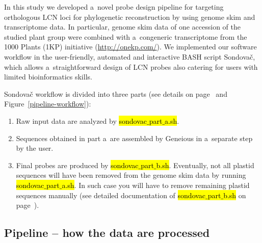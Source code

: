\documentclass[a4paper, 11pt, twoside]{article}
\renewcommand{\texttt}[1]{\hl{\ttfamily #1}}
\begin{document}
In this study \citep{Schmickl2016} we developed a~novel probe design pipeline for targeting orthologous LCN loci for phylogenetic reconstruction by using genome skim and transcriptome data. In particular, genome skim data of one accession of the studied plant group were combined with a~congeneric transcriptome from the 1000 Plants (1KP) initiative (\url{http://onekp.com/}). We implemented our software workflow in the user-friendly, automated and interactive BASH script Sondovač, which allows a~straightforward design of LCN probes also catering for users with limited bioinformatics skills.

Sondovač workflow is divided into three parts (see details on page~\pageref{pipeline-overview} and Figure~\ref{pipeline-workflow}):

\begin{enumerate}
\item Raw input data are analyzed by \texttt{sondovac$\_$part$\_$a.sh}.
\item Sequences obtained in part a~are assembled by Geneious in a~separate step by the user.
\item Final probes are produced by \texttt{sondovac$\_$part$\_$b.sh}. Eventually, not all plastid sequences will have been removed from the genome skim data by running \texttt{sondovac$\_$part$\_$a.sh}. In such case you will have to remove remaining plastid sequences manually (see detailed documentation of \texttt{sondovac$\_$part$\_$b.sh} on page~\pageref{partb}).
\end{enumerate}

\subsection{Pipeline -- how the data are processed}
\end{document}
